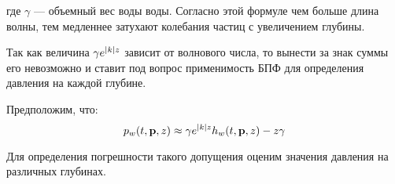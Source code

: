 где $\gamma$ --- объемный вес воды воды. Согласно этой формуле чем больше длина волны, тем медленнее затухают колебания частиц с увеличением глубины.

Так как величина $\gamma e^{\lvert k\rvert z}$ зависит от волнового числа, то вынести за знак суммы его невозможно и ставит под вопрос применимость БПФ для определения давления на каждой глубине.

Предположим, что:
\begin{equation}
\label{wave_height}
	p_w(t,\mathbf{p},z) \approx
		\gamma e^{\lvert k\rvert z} h_w(t,\mathbf{p},z) - z \gamma
\end{equation}

Для определения погрешности такого допущения оценим значения давления на различных глубинах.


